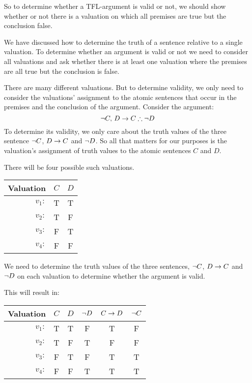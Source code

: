 
So to determine whether a TFL-argument is valid or not, we should show whether or not there is a valuation on which all premises are true but the conclusion false. 

We have discussed how to determine the truth of a sentence relative to a single valuation. To determine whether an argument is valid or not we need to consider all valuations and ask whether there is at least one valuation where the premises are all true but the conclusion is false. 

There are many different valuations. But to determine validity, we only need to consider the valuations' assignment to the atomic sentences that occur in the premises and the conclusion of the argument. Consider the argument:
$$\enot C,\,D\eif C\therefore\enot  D$$
To determine its validity, we only care about the truth values of the three sentence $\neg C$, $D\rightarrow C$ and $\neg D$. So all that matters for our purposes is the valuation's assignment of truth values to the atomic sentences $C$ and $D$.

There will be four possible such valuations. 
\begin{center}
	\begin{tabular}{rcc}
		Valuation&$C$&$D$\\\hline
		$v_1:$&T & T \\
		$v_2:$&T & F \\
		$v_3:$&F & T \\
		$v_4:$&F & F \\
	\end{tabular}
\end{center}

We need to determine the truth values of the three sentences, $\neg C$, $D\rightarrow C$ and $\neg D$ on each valuation to determine whether the argument is valid. 

This will result in:
 \begin{center}
	\begin{tabular}{rcc||c|c||c}
		Valuation&$C$&$D$&$\neg D$&$C\rightarrow D$&$\neg C$\\\hline
		$v_1:$&T & T & F & T & F\\
		$v_2:$&T & F & T & F & F\\
		$v_3:$&F & T & F & T & T\\
		$v_4:$&F & F & {T}& {T} & {T}
	\end{tabular}
\end{center}

